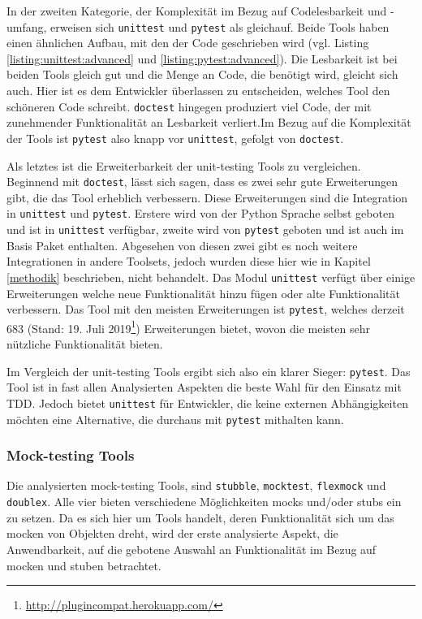 In der zweiten Kategorie, der Komplexität im Bezug auf Codelesbarkeit und
-umfang, erweisen sich \lstinline{unittest} und \lstinline{pytest} als 
gleichauf. Beide Tools haben einen ähnlichen Aufbau, mit den der Code 
geschrieben wird (vgl. Listing \ref{listing:unittest:advanced} und
\ref{listing:pytest:advanced}). Die Lesbarkeit ist bei beiden Tools gleich gut
und die Menge an Code, die benötigt wird, gleicht sich auch. Hier ist es dem
Entwickler überlassen zu entscheiden, welches Tool den schöneren Code schreibt.
\lstinline{doctest} hingegen produziert viel Code, der mit zunehmender
Funktionalität an Lesbarkeit verliert.Im Bezug auf die Komplexität der Tools
ist \lstinline{pytest} also knapp vor \lstinline{unittest}, gefolgt von
\lstinline{doctest}.
\newline

Als letztes ist die Erweiterbarkeit der unit-testing Tools zu vergleichen.
Beginnend mit \lstinline{doctest}, lässt sich sagen, dass es zwei sehr gute
Erweiterungen gibt, die das Tool erheblich verbessern. Diese Erweiterungen sind
die Integration in \lstinline{unittest} und \lstinline{pytest}. Erstere wird
von der Python Sprache selbst geboten und ist in \lstinline{unittest} verfügbar,
zweite wird von \lstinline{pytest} geboten und ist auch im Basis Paket
enthalten. Abgesehen von diesen zwei gibt es noch weitere Integrationen in
andere Toolsets, jedoch wurden diese hier wie in Kapitel \ref{methodik} 
beschrieben, nicht behandelt. Das Modul \lstinline{unittest} verfügt über 
einige Erweiterungen welche neue Funktionalität hinzu fügen oder alte 
Funktionalität verbessern. Das Tool mit den meisten Erweiterungen ist 
\lstinline{pytest}, welches derzeit 683 (Stand: 19. Juli 
2019\footnote{\url{http://plugincompat.herokuapp.com/}}) Erweiterungen
bietet, wovon die meisten sehr nützliche Funktionalität bieten.
\newline

Im Vergleich der unit-testing Tools ergibt sich also ein klarer Sieger:
\lstinline{pytest}. Das Tool ist in fast allen Analysierten Aspekten die beste
Wahl für den Einsatz mit TDD. Jedoch bietet \lstinline{unittest} für
Entwickler, die keine externen Abhängigkeiten möchten eine Alternative, die
durchaus mit \lstinline{pytest} mithalten kann.

\subsubsection{Mock-testing Tools}\label{python-tools:vergleich:mock}
Die analysierten \gls{mock}-testing Tools, sind \lstinline{stubble},
\lstinline{mocktest}, \lstinline{flexmock} und \lstinline{doublex}. Alle vier
bieten verschiedene Möglichkeiten \Glspl{mock} und/oder \Glspl{stub} ein zu
setzen. Da es sich hier um Tools handelt, deren Funktionalität sich um das
\Gls{mock}en von Objekten dreht, wird der erste analysierte Aspekt, die
Anwendbarkeit, auf die gebotene Auswahl an Funktionalität im Bezug auf
\Gls{mock}en und \Gls{stub}en betrachtet.

